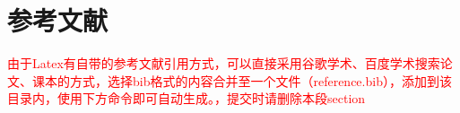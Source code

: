 \section{参考文献}
\textcolor{red}{由于Latex有自带的参考文献引用方式，可以直接采用谷歌学术、百度学术搜索论文、课本的方式，选择bib格式的内容合并至一个文件（reference.bib），添加到该目录内，使用下方命令即可自动生成。，提交时请删除本段section}





